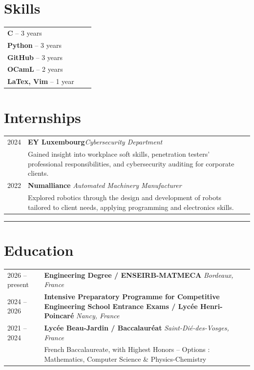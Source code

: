 \documentclass[10pt, a4paper]{article}
\begin{document}
\section*{\textbf{Skills}}
\begin{tabularx}{\textwidth}{@{}l X r@{}}
\textbf{C} -- 3 years
    \\
    \textbf{Python} -- 3 years
    \\
    \textbf{GitHub} -- 3 years 
    \\
    \textbf{OCamL} -- 2 years
    \\
    \textbf{LaTex, Vim} -- 1 year
\end{tabularx}

\section*{Internships}

\begin{tabularx}{\textwidth}{@{}l X r@{}}
    2024 & \textbf{EY Luxembourg}\quad \textit{Cybersecurity Department}
    \\
    & \small Gained insight into workplace soft skills, penetration testers' professional responsibilities, and cybersecurity auditing for corporate clients. 
    \\
    2022 & \textbf{Numalliance} \quad \textit{Automated Machinery Manufacturer}
    \\
    & \small Explored robotics through the design and development of robots tailored to client needs, applying programming and electronics skills.
\end{tabularx}

\rule{\textwidth}{0.4pt}  %


\section*{Education} %

\begin{tabularx}{\textwidth}{@{}l X r@{}}
    2026 -- present & \textbf{Engineering Degree / ENSEIRB-MATMECA} \quad \textit{Bordeaux, France}
    \\
    2024 -- 2026 & \textbf{Intensive Preparatory Programme for Competitive Engineering School Entrance Exams / Lycée Henri-Poincaré} \quad \textit{Nancy, France}
    \\
    2021 --  2024 & \textbf{Lycée Beau-Jardin / Baccalauréat} \quad \textit{Saint-Dié-des-Vosges, France}
    \\
    & \small French Baccalaureate, with Highest Honors -- Options : Mathematics, Computer Science \& Physics-Chemistry & \\[4pt]
\end{tabularx}
\end{document}
